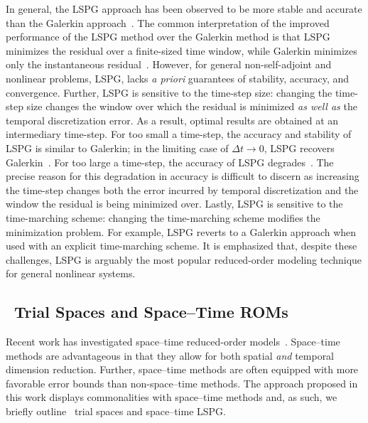 \documentclass[3p,computermodern,10pt]{elsarticle}
\begin{document}
In general, the LSPG approach has been observed to be more stable and accurate than the 
Galerkin approach~\cite{carlberg_lspg_v_galerkin,carlberg_thesis,carlberg_gnat}. The common interpretation of the improved performance of the LSPG method over the Galerkin method is that LSPG minimizes the residual over a finite-sized time window, while Galerkin minimizes only the instantaneous residual~\cite{carlberg_lspg_v_galerkin}.  
However, for general non-self-adjoint and nonlinear problems, LSPG, lacks \textit{a priori} guarantees of stability, accuracy, and convergence. Further, 
LSPG is sensitive to the time-step size: changing the time-step size changes the window over which the residual is minimized 
\textit{as well as} the temporal discretization error. As a result, optimal results are obtained at an intermediary time-step. 
For too small a time-step, the accuracy and stability of LSPG is similar to Galerkin; in the 
limiting case of $\Delta t \rightarrow 0$, LSPG recovers Galerkin~\cite{carlberg_lspg_v_galerkin}. 
For too large a time-step, the accuracy of LSPG degrades~\cite{carlberg_lspg_v_galerkin,parish_apg}. The 
precise reason for this degradation in accuracy is difficult to discern as increasing the time-step changes both the error incurred by 
temporal discretization and the window the residual is being minimized over. Lastly, LSPG is sensitive to the time-marching scheme: changing the 
time-marching scheme modifies the minimization problem. For example, LSPG reverts to a Galerkin approach 
when used with an explicit time-marching scheme. It is emphasized that, despite these challenges, 
LSPG is arguably the most popular reduced-order modeling technique for general nonlinear systems.

\subsection{\spaceTimeAcronym\ Trial Spaces and Space--Time ROMs}
Recent work has investigated space--time reduced-order models~\cite{choi_stlspg,constantine_strom,URBAN2012203,Yano2014ASC,benner_st,bui_thesis}. Space--time methods 
are advantageous in that they allow for both spatial \textit{and} temporal dimension reduction. Further, space--time 
methods are often equipped with more favorable error bounds than non-space--time methods. The approach proposed in this work displays commonalities 
with space--time methods and, as such, we briefly outline \spaceTimeAcronym\ trial spaces and space--time LSPG.
\end{document}
